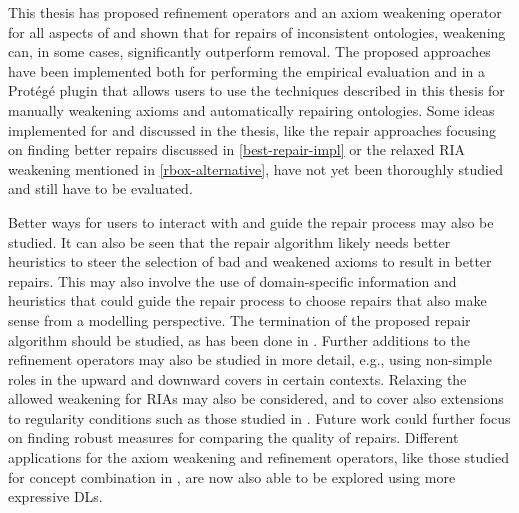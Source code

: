 
This thesis has proposed refinement operators and an axiom weakening operator for all aspects of \SROIQ and shown that for repairs of inconsistent ontologies, weakening can, in some cases, significantly outperform removal. The proposed approaches have been implemented both for performing the empirical evaluation and in a Protégé plugin that allows users to use the techniques described in this thesis for manually weakening axioms and automatically repairing ontologies. Some ideas implemented for and discussed in the thesis, like the repair approaches focusing on finding better repairs discussed in \cref{best-repair-impl} or the relaxed RIA weakening mentioned in \cref{rbox-alternative}, have not yet been thoroughly studied and still have to be evaluated.

Better ways for users to interact with and guide the repair process may also be studied. It can also be seen that the repair algorithm likely needs better heuristics to steer the selection of bad and weakened axioms to result in better repairs. This may also involve the use of domain-specific information and heuristics that could guide the repair process to choose repairs that also make sense from a modelling perspective. The termination of the proposed repair algorithm should be studied, as has been done in \cite{confalonieri2020towards}. Further additions to the refinement operators may also be studied in more detail, e.g., using non-simple roles in the upward and downward covers in certain contexts. Relaxing the allowed weakening for RIAs may also be considered, and to cover also extensions to regularity conditions such as those studied in \cite{DBLP:conf/cade/Kazakov10}. Future work could further focus on finding robust measures for comparing the quality of repairs. Different applications for the axiom weakening and refinement operators, like those studied for concept combination in \cite{righetti2022asymmetric}, are now also able to be explored using more expressive DLs.

